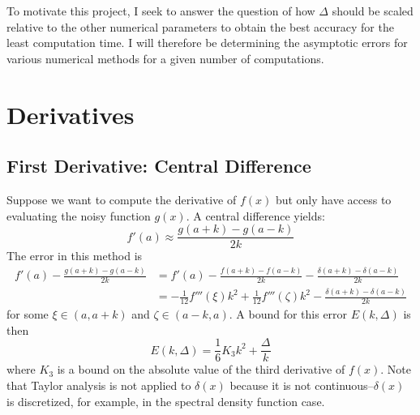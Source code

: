 \documentclass[letterpaper,11pt]{article}
\begin{document}
\begin{flushleft}
    To motivate this project, I seek to answer the question of how $\Delta$ should be scaled relative to the other numerical parameters to obtain the best accuracy for the least computation time. I will therefore be determining the asymptotic errors for various numerical methods for a given number of computations.

    \section{Derivatives}

    \subsection{First Derivative: Central Difference}
    Suppose we want to compute the derivative of $f(x)$ but only have access to evaluating the noisy function $g(x)$. A central difference yields:
    $$f'(a) \approx \frac{g(a+k) - g(a-k)}{2k}$$
    The error in this method is
    \begin{align*}
        f'(a) - \frac{g(a+k) - g(a-k)}{2k} &= f'(a) - \frac{f(a+k) - f(a-k)}{2k} - \frac{\delta(a+k) - \delta(a-k)}{2k} \\
        &= -\frac{1}{12}f'''(\xi)k^2 + \frac{1}{12}f'''(\zeta)k^2 - \frac{\delta(a+k) - \delta(a-k)}{2k}
    \end{align*}
    for some $\xi \in (a, a+k)$ and $\zeta \in (a-k, a)$. A bound for this error $E(k, \Delta)$ is then
    $$E(k, \Delta) = \frac{1}{6}K_3k^2 + \frac{\Delta}{k}$$
    where $K_3$ is a bound on the absolute value of the third derivative of $f(x)$. Note that Taylor analysis is not applied to $\delta(x)$ because it is not continuous--$\delta(x)$ is discretized, for example, in the spectral density function case.
    

\end{flushleft}
\end{document}
